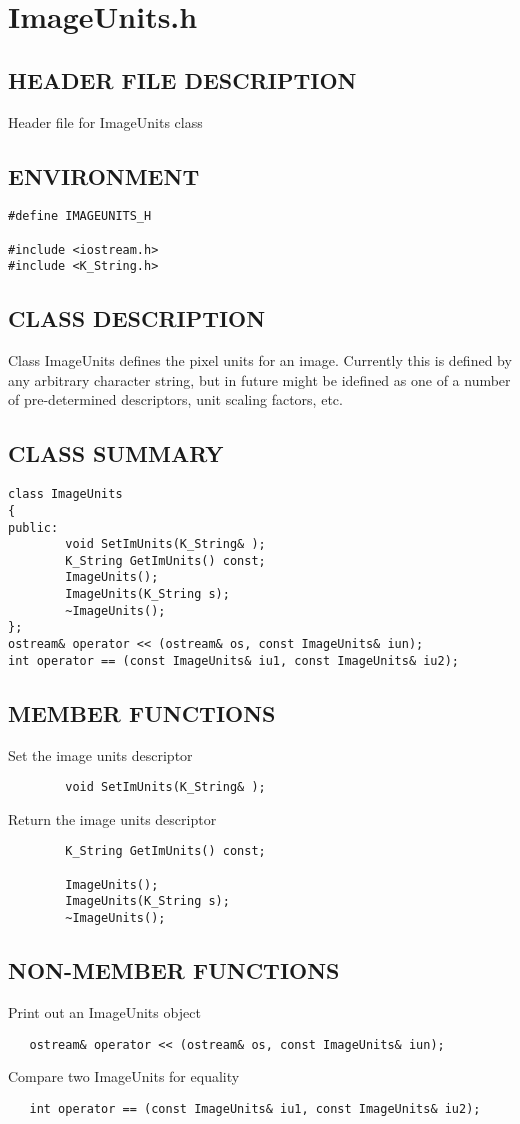 \clearpage
\section{ImageUnits.h}

\subsection*{HEADER FILE DESCRIPTION}
 Header file for ImageUnits class
  
\subsection*{ENVIRONMENT}
\begin{verbatim}
#define IMAGEUNITS_H

#include <iostream.h>
#include <K_String.h>
\end{verbatim}

\subsection*{CLASS DESCRIPTION}
   Class ImageUnits defines the pixel units for an image. Currently
  this is defined by any arbitrary character string, but in future might
  be idefined as one of a number of pre-determined descriptors, unit scaling
  factors, etc.

\subsection*{CLASS SUMMARY}
\begin{verbatim}
class ImageUnits
{
public:
        void SetImUnits(K_String& );
        K_String GetImUnits() const;
        ImageUnits();
        ImageUnits(K_String s);
        ~ImageUnits();
};
ostream& operator << (ostream& os, const ImageUnits& iun);
int operator == (const ImageUnits& iu1, const ImageUnits& iu2);
\end{verbatim}

\subsection*{MEMBER FUNCTIONS}
           Set the image units descriptor
\begin{verbatim}
        void SetImUnits(K_String& );
\end{verbatim}

           Return the image units descriptor
\begin{verbatim}
        K_String GetImUnits() const;

        ImageUnits();
        ImageUnits(K_String s);
        ~ImageUnits();
\end{verbatim}

\subsection*{NON-MEMBER FUNCTIONS}
 Print out an ImageUnits object
\begin{verbatim}
   ostream& operator << (ostream& os, const ImageUnits& iun);
\end{verbatim}

Compare two ImageUnits for equality
\begin{verbatim}
   int operator == (const ImageUnits& iu1, const ImageUnits& iu2);
\end{verbatim}

